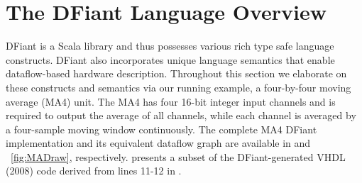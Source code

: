 \section{The DFiant Language Overview}
\label{sec:dfiant}
DFiant is a Scala library and thus possesses various rich type safe language constructs. DFiant also incorporates unique language semantics that enable dataflow-based hardware description. Throughout this section we elaborate on these constructs and semantics via our running example, a four-by-four moving average (MA4) unit. The MA4 has four 16-bit integer input channels and is required to output the average of all channels, while each channel is averaged by a four-sample moving window continuously. The complete MA4 DFiant implementation and its equivalent dataflow graph are available in  and ~\ref{fig:MADraw}, respectively.  presents a subset of the DFiant-generated VHDL (2008) code derived from lines 11-12 in .


